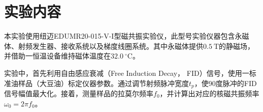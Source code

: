 \documentclass{thuemp}
\begin{document}



\wuhao 

\enlargethispage{-3.3cm}

\section{实验内容}

本实验使用纽迈EDUMR20-015-V-I型磁共振实验仪，此型号实验仪器包含永磁体、射频发生器、接收系统以及梯度线圈系统。其中永磁体提供$0.5 ~ \text{T}$的静磁场，并借助一恒温设备维持磁体温度在$32.0 ~ ^\circ\text{C}$。

实验中，首先利用自由感应衰减（Free Induction Decay， FID）信号，使用一标准油样品（大豆油）标定仪器参数。通过调节射频脉冲宽度$t_p$，使90度脉冲的FID信号幅值最大化。接着，测量样品的拉莫尔频率$f_0$，并计算出对应的核磁共振频率$\omega_0 = 2\pi f_0$。
\end{document}
